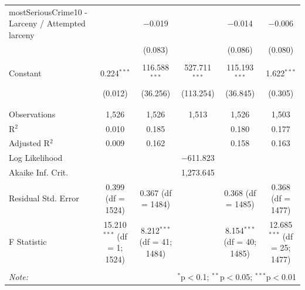 \documentclass[a4paper,12pt]{article}
\begin{document}
\begin{table}[!htbp]
{\begin{tabular}{@{\extracolsep{5pt}}lccccc}
 mostSeriousCrime10 - Larceny / Attempted larceny &  & $-$0.019 &  & $-$0.014 & $-$0.006 \\ 
  &  & (0.083) &  & (0.086) & (0.080) \\ 
  & & & & & \\ 
  Constant & 0.224$^{***}$ & 116.588$^{***}$ & 527.711$^{***}$ & 115.193$^{***}$ & 1.622$^{***}$ \\ 
  & (0.012) & (36.256) & (113.254) & (36.845) & (0.305) \\ 
  & & & & & \\ 
\hline \\[-1.8ex] 
Observations & 1,526 & 1,526 & 1,513 & 1,526 & 1,503 \\ 
R$^{2}$ & 0.010 & 0.185 &  & 0.180 & 0.177 \\ 
Adjusted R$^{2}$ & 0.009 & 0.162 &  & 0.158 & 0.163 \\ 
Log Likelihood &  &  & $-$611.823 &  &  \\ 
Akaike Inf. Crit. &  &  & 1,273.645 &  &  \\ 
Residual Std. Error & 0.399 (df = 1524) & 0.367 (df = 1484) &  & 0.368 (df = 1485) & 0.368 (df = 1477) \\ 
F Statistic & 15.210$^{***}$ (df = 1; 1524) & 8.212$^{***}$ (df = 41; 1484) &  & 8.154$^{***}$ (df = 40; 1485) & 12.685$^{***}$ (df = 25; 1477) \\ 
\hline 
\hline \\[-1.8ex] 
\textit{Note:}  & \multicolumn{5}{r}{$^{*}$p$<$0.1; $^{**}$p$<$0.05; $^{***}$p$<$0.01} \\ 
\end{tabular} }
\end{table} 
\end{document}
